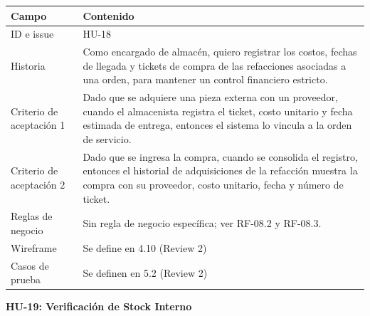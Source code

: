 {\def\LTcaptype{none} %
\begin{longtable}[]{@{}
  >{\raggedright\arraybackslash}p{}
  >{\raggedright\arraybackslash}p{}@{}}
\toprule\noalign{}
\begin{minipage}[b]{\linewidth}\raggedright
\textbf{Campo}
\end{minipage} & \begin{minipage}[b]{\linewidth}\raggedright
\textbf{Contenido}
\end{minipage} \\
\midrule\noalign{}
\endhead
\bottomrule\noalign{}
\endlastfoot
ID e issue & HU-18 \\
Historia & Como encargado de almacén, quiero registrar los costos,
fechas de llegada y tickets de compra de las refacciones asociadas a una
orden, para mantener un control financiero estricto. \\
Criterio de aceptación 1 & Dado que se adquiere una pieza externa con un
proveedor, cuando el almacenista registra el ticket, costo unitario y
fecha estimada de entrega, entonces el sistema lo vincula a la orden de
servicio. \\
Criterio de aceptación 2 & Dado que se ingresa la compra, cuando se
consolida el registro, entonces el historial de adquisiciones de la
refacción muestra la compra con su proveedor, costo unitario, fecha y
número de ticket. \\
Reglas de negocio & Sin regla de negocio específica; ver RF-08.2 y
RF-08.3. \\
Wireframe & Se define en 4.10 (Review 2) \\
Casos de prueba & Se definen en 5.2 (Review 2) \\
\end{longtable}
}

\textbf{HU-19: Verificación de Stock Interno}

